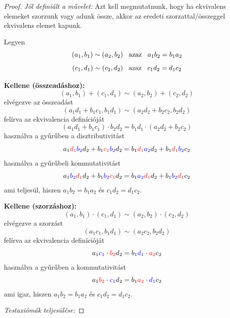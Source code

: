 \documentclass[12pt]{book}
\theoremstyle{plain} %
\theoremstyle{definition} %
\theoremstyle{remark}
\numberwithin{equation}{section}  %
\begin{document}
	\begin{proof}
		\text{ }
		
		\textit{Jól definiált a művelet:} Azt kell megmutatnunk, hogy ha ekvivalens elemeket szorzunk vagy adunk össze, akkor az eredeti szorzattal/összeggel ekvivalens elemet kapunk.
		
		Legyen
		\[ (a_1,b_1)\sim (a_2,b_2) \hspace{3mm} \text{azaz} \hspace{3mm} a_1b_2=b_1a_2 \]
		\[ (c_1,d_1)\sim (c_2,d_2) \hspace{3mm} \text{azaz} \hspace{3mm} c_1d_2=d_1c_2 \]
		
		\textbf{Kellene (összeadáshoz):}
		\[ (a_1,b_1) + (c_1,d_1) \sim (a_2,b_2)+(c_2,d_2)  \]
		elvégezve az összeadást
		\[ (a_1d_1+b_1c_1,b_1d_1) \sim (a_2d_2+b_2c_2,b_2d_2)  \]
		felírva az ekvivalencia definícióját
		\[ (a_1d_1+b_1c_1)\cdot b_2d_2 = b_1d_1 \cdot (a_2d_2+b_2c_2)  \]
		használva a gyűrűben a disztributivitást
		\[ a_1\color{red}d_1\color{blue}b_2\color{black}d_2 + b_1\color{red}c_1\color{blue}b_2\color{black}d_2 = b_1\color{red}d_1\color{blue}a_2\color{black}d_2 + b_1\color{red}d_1\color{blue}b_2\color{black}c_2  \]
		használva a gyűrűbeli kommutativitást
		\[ a_1\color{blue}b_2\color{red}d_1\color{black}d_2 + b_1\color{blue}b_2\color{red}c_1\color{black}d_2 = b_1\color{blue}a_2\color{red}d_1\color{black}d_2 + b_1\color{blue}b_2\color{red}d_1\color{black}c_2  \]
		ami teljesül, hiszen $a_1b_2=b_1a_2$ és $c_1d_2=d_1c_2$.
		
		\textbf{Kellene (szorzáshoz):}
		\[ (a_1,b_1)\cdot (c_1,d_1) \sim (a_2,b_2)\cdot (c_2,d_2)  \]
		elvégezve a szorzást
		\[ (a_1c_1,b_1d_1) \sim (a_2c_2,b_2d_2)  \]
		felírva az ekvivalencia definícióját
		\[ a_1\color{blue}c_1\color{black}\cdot \color{red}b_2\color{black}d_2 = b_1\color{blue}d_1\color{black}\cdot \color{red}a_2\color{black}c_2  \]
		használva a gyűrűben a kommutativitást
		\[ a_1\color{red}b_2\color{black}\cdot \color{blue}c_1\color{black}d_2 = b_1\color{red}a_2\color{black}\cdot \color{blue}d_1\color{black}c_2  \]
		ami igaz, hiszen $a_1b_2=b_1a_2$ és $c_1d_2=d_1c_2$.
		
		\textit{Testaxiómák teljesülése:}
		

\end{proof}
\end{document}
